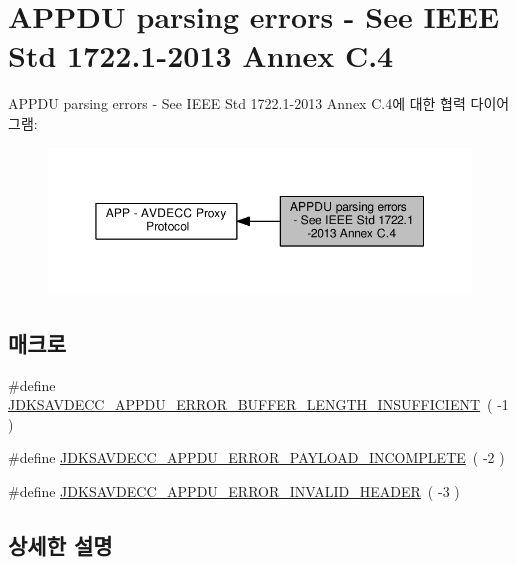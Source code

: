 \hypertarget{group__appdu__errors}{}\section{A\+P\+P\+DU parsing errors -\/ See I\+E\+EE Std 1722.1-\/2013 Annex C.4}
\label{group__appdu__errors}
A\+P\+P\+DU parsing errors -\/ See I\+E\+EE Std 1722.1-\/2013 Annex C.4에 대한 협력 다이어그램\+:
\nopagebreak
\begin{figure}[H]
\begin{center}
\leavevmode
\includegraphics[width=350pt]{group__appdu__errors}
\end{center}
\end{figure}
\subsection*{매크로}
\begin{DoxyCompactItemize}
\item 
\#define \hyperlink{group__appdu__errors_gac3f69cd1306f26882c58d008eb975e0f}{J\+D\+K\+S\+A\+V\+D\+E\+C\+C\+\_\+\+A\+P\+P\+D\+U\+\_\+\+E\+R\+R\+O\+R\+\_\+\+B\+U\+F\+F\+E\+R\+\_\+\+L\+E\+N\+G\+T\+H\+\_\+\+I\+N\+S\+U\+F\+F\+I\+C\+I\+E\+NT}~( -\/1 )
\item 
\#define \hyperlink{group__appdu__errors_gabe3e811ac0be333fe56dd1082062913c}{J\+D\+K\+S\+A\+V\+D\+E\+C\+C\+\_\+\+A\+P\+P\+D\+U\+\_\+\+E\+R\+R\+O\+R\+\_\+\+P\+A\+Y\+L\+O\+A\+D\+\_\+\+I\+N\+C\+O\+M\+P\+L\+E\+TE}~( -\/2 )
\item 
\#define \hyperlink{group__appdu__errors_gab87365f108c8b06ef41b56adaf53ec2d}{J\+D\+K\+S\+A\+V\+D\+E\+C\+C\+\_\+\+A\+P\+P\+D\+U\+\_\+\+E\+R\+R\+O\+R\+\_\+\+I\+N\+V\+A\+L\+I\+D\+\_\+\+H\+E\+A\+D\+ER}~( -\/3 )
\end{DoxyCompactItemize}


\subsection{상세한 설명}


